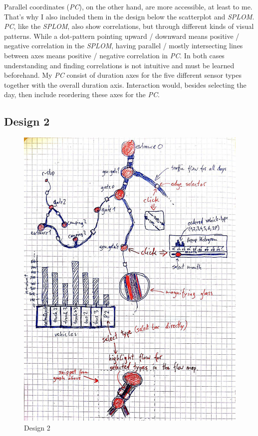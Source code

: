 \documentclass{article}
\begin{document}
Parallel coordinates (\textit{PC}), on the other hand, are more accessible, at least to me. That's why I also included them in the design below the scatterplot and \textit{SPLOM}. \textit{PC}, like the \textit{SPLOM}, also show correlations, but through different kinds of visual patterns. While a dot-pattern pointing upward / downward means positive / negative correlation in the \textit{SPLOM}, having parallel / mostly intersecting lines between axes means positive / negative correlation in \textit{PC}\citep{munzner2015visualization}. In both cases understanding and finding correlations is not intuitive and must be learned beforehand. My \textit{PC} consist of duration axes for the five different sensor types together with the overall duration axis. Interaction would, besides selecting the day, then include reordering these axes for the \textit{PC}.



\subsection*{Design 2}

\begin{figure}
	\centering
	\includegraphics[scale=0.599]{Design2.jpg}	
	\caption{Design 2}
	\label{fig:design2}
\end{figure}
\end{document}
